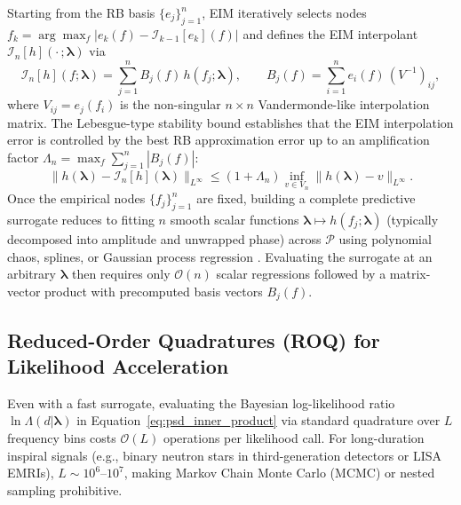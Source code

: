 \documentclass[11pt, a4paper]{article}
\begin{document}
Starting from the RB basis $\{e_j\}_{j=1}^n$, EIM iteratively selects nodes $f_k = \arg\max_f |e_k(f) - \mathcal{I}_{k-1}[e_k](f)|$ and defines the EIM interpolant $\mathcal{I}_n[h](\cdot\,; \boldsymbol{\lambda})$ via
\begin{equation}
\mathcal{I}_n[h](f; \boldsymbol{\lambda}) = \sum_{j=1}^n B_j(f)\, h(f_j; \boldsymbol{\lambda}) , \qquad
B_j(f) = \sum_{i=1}^n e_i(f)\,(V^{-1})_{ij} ,
\label{eq:eim_interpolant}
\end{equation}
where $V_{ij} = e_j(f_i)$ is the non-singular $n \times n$ Vandermonde-like interpolation matrix. The Lebesgue-type stability bound establishes that the EIM interpolation error is controlled by the best RB approximation error up to an amplification factor $\Lambda_n = \max_f \sum_{j=1}^n |B_j(f)|$:
\begin{equation}
\bigl\| h(\boldsymbol{\lambda}) - \mathcal{I}_n[h](\boldsymbol{\lambda}) \bigr\|_{L^\infty} \le (1 + \Lambda_n) \inf_{v \in V_n} \| h(\boldsymbol{\lambda}) - v \|_{L^\infty} .
\label{eq:eim_bound}
\end{equation}
Once the empirical nodes $\{f_j\}_{j=1}^n$ are fixed, building a complete predictive surrogate reduces to fitting $n$ smooth scalar functions $\boldsymbol{\lambda} \mapsto h(f_j; \boldsymbol{\lambda})$ (typically decomposed into amplitude and unwrapped phase) across $\mathcal{P}$ using polynomial chaos, splines, or Gaussian process regression \cite{Field2014,Blackman2017}. Evaluating the surrogate at an arbitrary $\boldsymbol{\lambda}$ then requires only $\mathcal{O}(n)$ scalar regressions followed by a matrix-vector product with precomputed basis vectors $B_j(f)$.

\subsection{Reduced-Order Quadratures (ROQ) for Likelihood Acceleration}

Even with a fast surrogate, evaluating the Bayesian log-likelihood ratio $\ln \Lambda(d|\boldsymbol{\lambda})$ in Equation~\eqref{eq:psd_inner_product} via standard quadrature over $L$ frequency bins costs $\mathcal{O}(L)$ operations per likelihood call. For long-duration inspiral signals (e.g., binary neutron stars in third-generation detectors or LISA EMRIs), $L \sim 10^6$--$10^7$, making Markov Chain Monte Carlo (MCMC) or nested sampling prohibitive.
\end{document}
